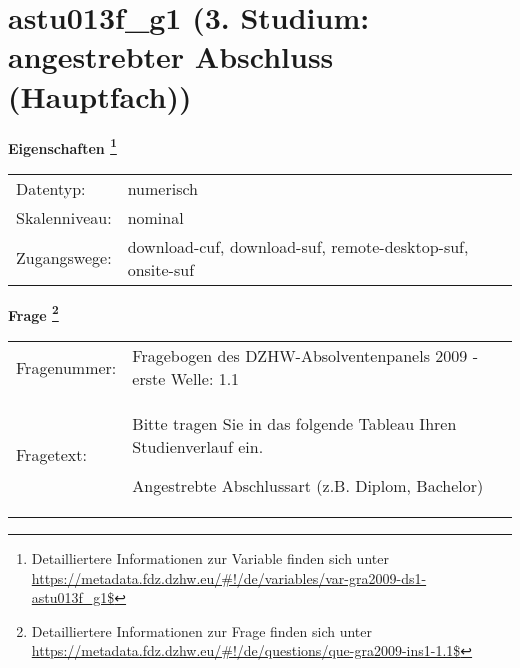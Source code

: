 
    \setcounter{footnote}{0}

    \vspace*{-1.8cm}
	\section{astu013f\_g1 (3. Studium: angestrebter Abschluss (Hauptfach))}
	\label{section:astu013f_g1}



    \vspace*{0.5cm}
    \noindent\textbf{Eigenschaften
	\footnote{Detailliertere Informationen zur Variable finden sich unter
		\url{https://metadata.fdz.dzhw.eu/\#!/de/variables/var-gra2009-ds1-astu013f_g1$}}}\\
	\begin{tabularx}{\hsize}{@{}lX}
	Datentyp: & numerisch \\
	Skalenniveau: & nominal \\
	Zugangswege: &
	  download-cuf, 
	  download-suf, 
	  remote-desktop-suf, 
	  onsite-suf
 \\
    \end{tabularx}



				\vspace*{0.5cm}
                \noindent\textbf{Frage
	                \footnote{Detailliertere Informationen zur Frage finden sich unter
		              \url{https://metadata.fdz.dzhw.eu/\#!/de/questions/que-gra2009-ins1-1.1$}}}\\
				\begin{tabularx}{\hsize}{@{}lX}
					Fragenummer: &
					  Fragebogen des DZHW-Absolventenpanels 2009 - erste Welle:
					  1.1
 \\
					Fragetext: & Bitte tragen Sie in das folgende Tableau Ihren Studienverlauf ein.\par  Angestrebte Abschlussart (z.B. Diplom, Bachelor) \\
				\end{tabularx}





